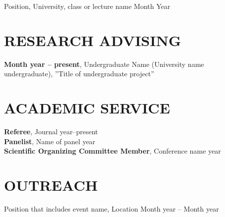 \documentclass[11pt]{res} %
\newcommand{\titlegap}{5pt} %
\newcommand{\sectgap}{0.05in} %
\begin{document}
\begin{resume}
\vspace{\titlegap} 
Position, University, class or lecture name \hfill Month Year

\vspace{\sectgap} 



\section{RESEARCH ADVISING}
\vspace{\titlegap} 
\textbf{Month year -- present}, Undergraduate Name (University name undergraduate), ''Title of undergraduate project''\\


\section{ACADEMIC SERVICE}
\vspace{\titlegap} 
\textbf{Referee}, Journal \hfill  year--present \\
\textbf{Panelist}, Name of panel \hfill year\\
\textbf{Scientific Organizing Committee Member}, Conference name \hfill year




\section{OUTREACH}

\vspace{\titlegap} 

Position that includes event name, Location \hfill Month year -- Month year

\vspace{\sectgap} 




\end{resume}
\end{document}
